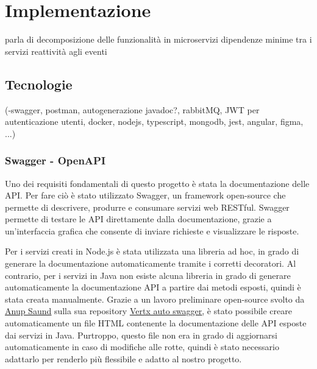 \chapter{Implementazione}
\label{ch:implementazione} %
parla di decomposizione delle funzionalità in microservizi
dipendenze minime tra i servizi
reattività agli eventi
\section{Tecnologie}
(-swagger, postman, autogenerazione javadoc?, rabbitMQ, JWT per autenticazione utenti,
 docker, nodejs, typescript, mongodb, jest, angular, figma, ...)
\subsection{Swagger - OpenAPI}

Uno dei requisiti fondamentali di questo progetto è stata la documentazione delle API.
Per fare ciò è stato utilizzato Swagger, un framework open-source che permette di descrivere, produrre e consumare servizi web RESTful. 
Swagger permette di testare le API direttamente dalla documentazione, grazie a un'interfaccia grafica che consente di inviare richieste e visualizzare le risposte.

\vspace{1cm}

Per i servizi creati in Node.js è stata utilizzata una libreria ad hoc, in grado di generare la documentazione automaticamente tramite i corretti decoratori.
Al contrario, per i servizi in Java non esiste alcuna libreria in grado di generare automaticamente la documentazione API a partire dai metodi esposti, quindi è stata creata manualmente.
Grazie a un lavoro preliminare open-source svolto da \href{https://github.com/anupsaund}{\underline{Anup Saund}} sulla sua repository \href{https://github.com/anupsaund/vertx-auto-swagger}{\underline{Vertx auto swagger}}, è stato possibile creare automaticamente un file HTML contenente la documentazione delle API esposte dai servizi in Java. 
Purtroppo, questo file non era in grado di aggiornarsi automaticamente in caso di modifiche alle rotte, quindi è stato necessario adattarlo per renderlo più flessibile e adatto al nostro progetto.

\vspace{1cm}

